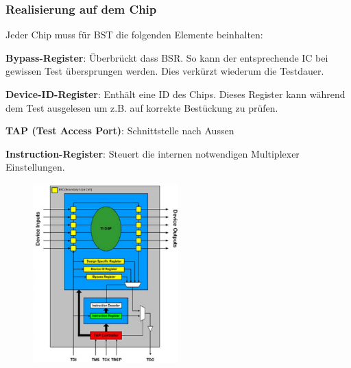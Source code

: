 \begin{multicols}{2}
    \subsubsection{Realisierung auf dem Chip}
    Jeder Chip muss für BST die folgenden Elemente beinhalten:
    \begin{compactitem}
        \item \textbf{Bypass-Register}: Überbrückt dass BSR. So kann der entsprechende IC bei gewissen Test übersprungen werden. Dies verkürzt wiederum die Testdauer.
        \item \textbf{Device-ID-Register}: Enthält eine ID des Chips. Dieses Register kann während dem Test ausgelesen um z.B. auf korrekte Bestückung zu prüfen.
        \item \textbf{TAP (Test Access Port)}: Schnittstelle nach Aussen
        \item \textbf{Instruction-Register}: Steuert die internen notwendigen Multiplexer Einstellungen.
    \end{compactitem}
    \begin{figure}[H]
        \includegraphics[width=0.5\textwidth]{images/bst_aufbau.png}
    \end{figure} \ \\ \ \\
\end{multicols}

